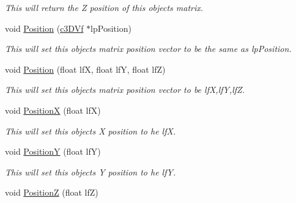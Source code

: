\begin{DoxyCompactItemize}
\begin{DoxyCompactList}\small\item\em This will return the Z position of this objects matrix. \end{DoxyCompactList}\item 
\hypertarget{classc_camera_matrix4_a7110b0f3aa924a2cfefe8ca149e0b41f}{
void \hyperlink{classc_camera_matrix4_a7110b0f3aa924a2cfefe8ca149e0b41f}{Position} (\hyperlink{classc3_d_vf}{c3DVf} $\ast$lpPosition)}
\label{classc_camera_matrix4_a7110b0f3aa924a2cfefe8ca149e0b41f}

\begin{DoxyCompactList}\small\item\em This will set this objects matrix position vector to be the same as lpPosition. \end{DoxyCompactList}\item 
\hypertarget{classc_camera_matrix4_a1aa471464a30ce27fe339b743b840516}{
void \hyperlink{classc_camera_matrix4_a1aa471464a30ce27fe339b743b840516}{Position} (float lfX, float lfY, float lfZ)}
\label{classc_camera_matrix4_a1aa471464a30ce27fe339b743b840516}

\begin{DoxyCompactList}\small\item\em This will set this objects matrix position vector to be lfX,lfY,lfZ. \end{DoxyCompactList}\item 
\hypertarget{classc_camera_matrix4_af130ddef040458f01b9a2365f41c567a}{
void \hyperlink{classc_camera_matrix4_af130ddef040458f01b9a2365f41c567a}{PositionX} (float lfX)}
\label{classc_camera_matrix4_af130ddef040458f01b9a2365f41c567a}

\begin{DoxyCompactList}\small\item\em This will set this objects X position to he lfX. \end{DoxyCompactList}\item 
\hypertarget{classc_camera_matrix4_adce3f6365faf3af907994f50c004c736}{
void \hyperlink{classc_camera_matrix4_adce3f6365faf3af907994f50c004c736}{PositionY} (float lfY)}
\label{classc_camera_matrix4_adce3f6365faf3af907994f50c004c736}

\begin{DoxyCompactList}\small\item\em This will set this objects Y position to he lfY. \end{DoxyCompactList}\item 
\hypertarget{classc_camera_matrix4_a6ea814a92ce2d7fcc1ba66490127b2f2}{
void \hyperlink{classc_camera_matrix4_a6ea814a92ce2d7fcc1ba66490127b2f2}{PositionZ} (float lfZ)}
\label{classc_camera_matrix4_a6ea814a92ce2d7fcc1ba66490127b2f2}


\end{DoxyCompactItemize}
